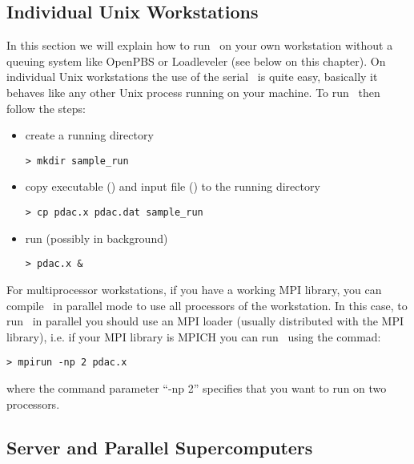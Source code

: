 \subsection{Individual Unix Workstations}

In this section we will explain how to run \PDAC\ on your own
workstation without a queuing system like
OpenPBS or Loadleveler (see below on this chapter).
On individual Unix workstations the use of the serial \PDAC\ is
quite easy, basically it behaves like any other Unix process
running on your machine.
To run \PDAC\ then follow the steps:

\begin{itemize}

\item create a running directory\
\begin{verbatim}
> mkdir sample_run
\end{verbatim}

\item copy executable () and input file ()
      to the running directory\
\begin{verbatim}
> cp pdac.x pdac.dat sample_run
\end{verbatim}

\item run  (possibly in background)
\begin{verbatim}
> pdac.x &
\end{verbatim}

\end{itemize}

For multiprocessor workstations, if you have a working MPI
library, you can compile \PDAC\ in parallel mode to use
all processors of the workstation. In this case,
to run \PDAC\ in parallel you should use an MPI loader 
(usually distributed with the MPI library), i.e. if
your MPI library is MPICH you can run \PDAC\ using the commad:

\begin{verbatim}
> mpirun -np 2 pdac.x
\end{verbatim}

where the command parameter ``-np 2'' specifies that you want
to run on two processors.

\subsection{Server and Parallel Supercomputers}

